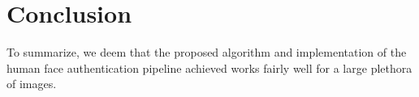 



\section{Conclusion}

To summarize, we deem that the proposed algorithm and implementation of the human face authentication pipeline achieved works fairly well for a large plethora of images.